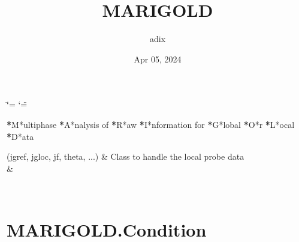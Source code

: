 \documentclass[letterpaper,10pt,english]{sphinxmanual}
\title{MARIGOLD}
\date{Apr 05, 2024}
\author{adix}
\begin{document}
\ifdefined\shorthandoff
  \ifnum\catcode`\=\string=\active\shorthandoff{=}\fi
  \ifnum\catcode`\"=\active{}\fi
\fi

\pagestyle{empty}
\sphinxmaketitle
\pagestyle{plain}
\sphinxtableofcontents
\pagestyle{normal}
\label{\detokenize{index::doc}}


\sphinxAtStartPar
{\color{red}\bfseries{}*}M*ultiphase {\color{red}\bfseries{}*}A*nalysis of {\color{red}\bfseries{}*}R*aw {\color{red}\bfseries{}*}I*nformation for {\color{red}\bfseries{}*}G*lobal {\color{red}\bfseries{}*}O*r {\color{red}\bfseries{}*}L*ocal {\color{red}\bfseries{}*}D*ata


\begin{savenotes}\sphinxattablestart
\sphinxthistablewithglobalstyle
\sphinxthistablewithnovlinesstyle
\centering
\begin{tabulary}{\linewidth}[t]{}
\sphinxtoprule
\sphinxtableatstartofbodyhook
\sphinxAtStartPar
{\hyperref[\detokenize{modules/MARIGOLD.Condition:MARIGOLD.Condition}]{}}(jgref, jgloc, jf, theta, ...)
&
\sphinxAtStartPar
Class to handle the local probe data
\\
\sphinxhline
\sphinxAtStartPar
{\hyperref[\detokenize{modules/MARIGOLD.extracts_and_loads:module-MARIGOLD.extracts_and_loads}]{}}
&
\sphinxAtStartPar

\\
\sphinxbottomrule
\end{tabulary}
\sphinxtableafterendhook\par
\sphinxattableend\end{savenotes}

\sphinxstepscope


\chapter{MARIGOLD.Condition}
\label{\detokenize{modules/MARIGOLD.Condition:marigold-condition}}\label{\detokenize{modules/MARIGOLD.Condition::doc}}
\end{document}
